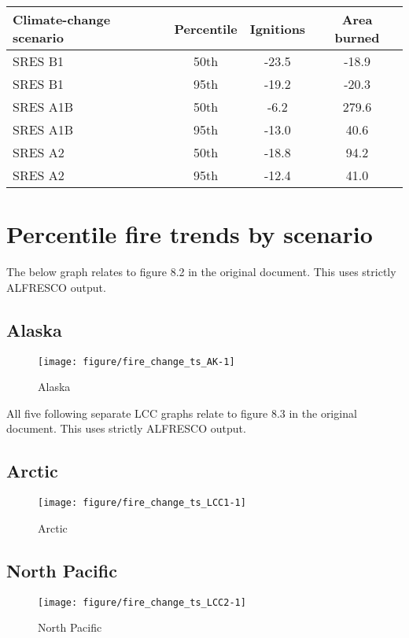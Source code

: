\documentclass{article}\usepackage[]{graphicx}\usepackage[]{color}
\makeatletter
\def\maxwidth{ %
  \ifdim\Gin@nat@width>\linewidth
    \linewidth
  \else
    \Gin@nat@width
  \fi
}
\newcommand{\headcol}{\rowcolor{tableheadcolor}}
\makeatother
\begin{document}
\begin{table}[ht]
\centering
\begin{tabular}{lccc}
  \headcol 
 \toprule
Climate-change scenario & Percentile & Ignitions & Area burned \\ 
  \midrule
SRES B1 & 50th & -23.5 & -18.9 \\ 
  SRES B1 & 95th & -19.2 & -20.3 \\ 
  SRES A1B & 50th & -6.2 & 279.6 \\ 
  SRES A1B & 95th & -13.0 & 40.6 \\ 
  SRES A2 & 50th & -18.8 & 94.2 \\ 
  SRES A2 & 95th & -12.4 & 41.0 \\ 
   \bottomrule
\end{tabular}
\end{table}


\newpage
\pagebreak
\section{Percentile fire trends by scenario}
The below graph relates to figure 8.2 in the original document.
This uses strictly ALFRESCO output.

\subsection{Alaska}
\begin{figure}[H]
\texttt{[image: figure/fire\_change\_ts\_AK-1]} \caption[Alaska]{Alaska}\label{fig:fire_change_ts_AK}
\end{figure}



All five following separate LCC graphs relate to figure 8.3 in the original document.
This uses strictly ALFRESCO output.

\subsection{Arctic}
\begin{figure}[H]
\texttt{[image: figure/fire\_change\_ts\_LCC1-1]} \caption[Arctic]{Arctic}\label{fig:fire_change_ts_LCC1}
\end{figure}



\subsection{North Pacific}
\begin{figure}[H]
\texttt{[image: figure/fire\_change\_ts\_LCC2-1]} \caption[North Pacific]{North Pacific}\label{fig:fire_change_ts_LCC2}
\end{figure}
\end{document}
